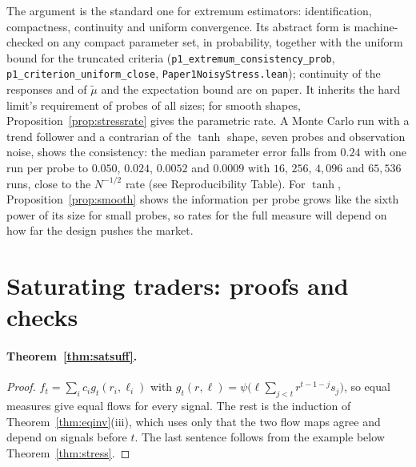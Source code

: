 \documentclass[12pt]{article}
\theoremstyle{definition}
\theoremstyle{remark}
\begin{document}
The argument is the standard one for extremum estimators: identification, compactness, continuity and uniform convergence. Its abstract form is machine-checked on any compact parameter set, in probability, together with the uniform bound for the truncated criteria (\texttt{p1\_extremum\_consistency\_prob}, \texttt{p1\_criterion\_uniform\_close}, \nolinkurl{Paper1NoisyStress.lean}); continuity of the responses and of $\tilde\mu$ and the expectation bound are on paper. It inherits the hard limit's requirement of probes of all sizes; for smooth shapes, Proposition~\ref{prop:stressrate} gives the parametric rate. A Monte Carlo run with a trend follower and a contrarian of the $\tanh$ shape, seven probes and observation noise, shows the consistency: the median parameter error falls from $0.24$ with one run per probe to $0.050$, $0.024$, $0.0052$ and $0.0009$ with $16$, $256$, $4{,}096$ and $65{,}536$ runs, close to the $N^{-1/2}$ rate (see Reproducibility Table). For $\tanh$, Proposition~\ref{prop:smooth} shows the information per probe grows like the sixth power of its size for small probes, so rates for the full measure will depend on how far the design pushes the market.

\section{Saturating traders: proofs and checks}\label{app:saturating}

\paragraph{Theorem~\ref{thm:satsuff}.}
\begin{proof}
$f_t=\sum_ic_ig_t(r_i,\ell_i)$ with $g_t(r,\ell)=\psi\bigl(\ell\sum_{j<t}r^{t-1-j}s_j\bigr)$, so equal measures give equal flows for every signal. The rest is the induction of Theorem~\ref{thm:eqinv}(iii), which uses only that the two flow maps agree and depend on signals before $t$. The last sentence follows from the example below Theorem~\ref{thm:stress}.
\end{proof}
\end{document}
